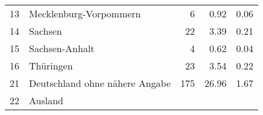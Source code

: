 \begin{longtable}{lXrrr}
     13 &
     \multicolumn{1}{X}{ Mecklenburg-Vorpommern   } &


       \num{6} &
       \num[round-mode=places,round-precision=2]{0,92} &
         \num[round-mode=places,round-precision=2]{0,06} \\

     14 &
     \multicolumn{1}{X}{ Sachsen   } &


       \num{22} &
       \num[round-mode=places,round-precision=2]{3,39} &
         \num[round-mode=places,round-precision=2]{0,21} \\

     15 &
     \multicolumn{1}{X}{ Sachsen-Anhalt   } &


       \num{4} &
       \num[round-mode=places,round-precision=2]{0,62} &
         \num[round-mode=places,round-precision=2]{0,04} \\

     16 &
     \multicolumn{1}{X}{ Thüringen   } &


       \num{23} &
       \num[round-mode=places,round-precision=2]{3,54} &
         \num[round-mode=places,round-precision=2]{0,22} \\

     21 &
     \multicolumn{1}{X}{ Deutschland ohne nähere Angabe   } &


       \num{175} &
       \num[round-mode=places,round-precision=2]{26,96} &
         \num[round-mode=places,round-precision=2]{1,67} \\

     22 &
     \multicolumn{1}{X}{ Ausland   } &



\end{longtable}
